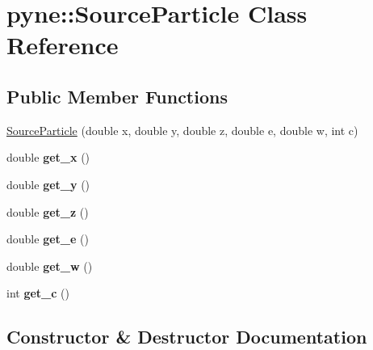 \hypertarget{classpyne_1_1_source_particle}{}\section{pyne\+:\+:Source\+Particle Class Reference}
\label{classpyne_1_1_source_particle}
\subsection*{Public Member Functions}
\begin{DoxyCompactItemize}
\item 
\hyperlink{classpyne_1_1_source_particle_a854ff31d32d2f59fe477563830dc90dc}{Source\+Particle} (double x, double y, double z, double e, double w, int c)
\item 
\mbox{\label{classpyne_1_1_source_particle_a7f3b846bd35379ed54af32f6ded96067}} 
double {\bfseries get\+\_\+x} ()
\item 
\mbox{\label{classpyne_1_1_source_particle_a5ec4c22186d3dad1a5ee653b0f0e5258}} 
double {\bfseries get\+\_\+y} ()
\item 
\mbox{\label{classpyne_1_1_source_particle_af61510f070015b5c67f5ac101e83c3c3}} 
double {\bfseries get\+\_\+z} ()
\item 
\mbox{\label{classpyne_1_1_source_particle_a3cc030d9d6ad67bcb59cb614c6287c45}} 
double {\bfseries get\+\_\+e} ()
\item 
\mbox{\label{classpyne_1_1_source_particle_a132fc1c5f80df8f3c01c8d6ace8c92e5}} 
double {\bfseries get\+\_\+w} ()
\item 
\mbox{\label{classpyne_1_1_source_particle_a6a871c8543fb4a5b201a357d8e58032b}} 
int {\bfseries get\+\_\+c} ()
\end{DoxyCompactItemize}


\subsection{Constructor \& Destructor Documentation}
\mbox{\label{classpyne_1_1_source_particle_a854ff31d32d2f59fe477563830dc90dc}} 
